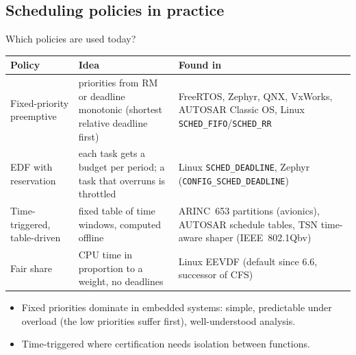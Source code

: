 \subsection{Scheduling policies in practice}
\begin{frame}{Which policies are used today?}
  \begin{center}\footnotesize
  \begin{tabular}{@{}>{\raggedright\arraybackslash}p{3.4cm}>{\raggedright\arraybackslash}p{5.2cm}>{\raggedright\arraybackslash}p{5.0cm}@{}}
    \toprule
    Policy & Idea & Found in \\
    \midrule
    Fixed-priority preemptive & priorities from RM or deadline monotonic (shortest relative deadline first) & FreeRTOS, Zephyr, QNX, VxWorks, AUTOSAR Classic OS, Linux \texttt{SCHED\_FIFO}/\texttt{SCHED\_RR} \\
    EDF with reservation & each task gets a budget per period; a task that overruns is throttled & Linux \texttt{SCHED\_DEADLINE}, Zephyr (\texttt{CONFIG\_SCHED\_DEADLINE}) \\
    Time-triggered, table-driven & fixed table of time windows, computed offline & ARINC~653 partitions (avionics), AUTOSAR schedule tables, TSN time-aware shaper (IEEE~802.1Qbv) \\
    Fair share & CPU time in proportion to a weight, no deadlines & Linux EEVDF (default since 6.6, successor of CFS) \\
    \bottomrule
  \end{tabular}
  \end{center}
  \begin{itemize}
    \item Fixed priorities dominate in embedded systems: simple, predictable under overload (the low priorities suffer first), well-understood analysis.
    \item Time-triggered where certification needs isolation between functions.
  \end{itemize}
\end{frame}

